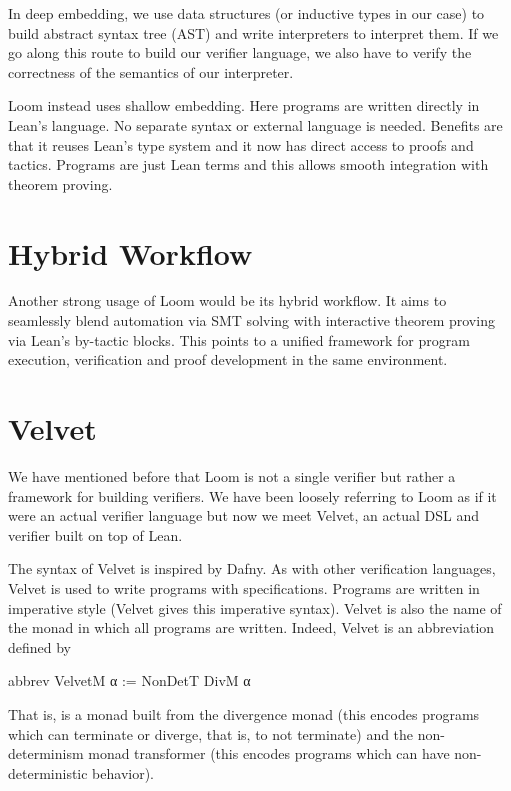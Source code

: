 In deep embedding, we use data structures (or inductive types in our case) to
build abstract syntax tree (AST) and write interpreters to interpret them. If we
go along this route to build our verifier language, we also have to verify the
correctness of the semantics of our interpreter.

Loom instead uses shallow embedding. Here programs are written directly in
Lean's language. No separate syntax or external language is needed. Benefits are
that it reuses Lean's type system and it now has direct access to proofs and
tactics. Programs are just Lean terms and this allows smooth integration with
theorem proving.


\section{Hybrid Workflow}

Another strong usage of Loom would be its hybrid workflow. It aims to seamlessly
blend automation via SMT solving with interactive theorem proving via Lean's
by-tactic blocks. This points to a unified framework for program execution,
verification and proof development in the same environment.

\section{Velvet}

We have mentioned before that Loom is not a single verifier but rather a
framework for building verifiers. We have been loosely referring to Loom as if
it were an actual verifier language but now we meet Velvet, an actual DSL and
verifier built on top of Lean.

The syntax of Velvet is inspired by Dafny. As with other verification languages,
Velvet is used to write programs with specifications. Programs are written in
imperative style (Velvet gives this imperative syntax). Velvet is also the name
of the monad in which all programs are written. Indeed, Velvet is an
abbreviation defined by

\begin{leanblock}
  abbrev VelvetM α := NonDetT DivM α
\end{leanblock}

That is,  is a monad built from the divergence monad 
(this encodes programs which can terminate or diverge, that is, to not
terminate) and the non-determinism monad transformer  (this
encodes programs which can have non-deterministic behavior).

